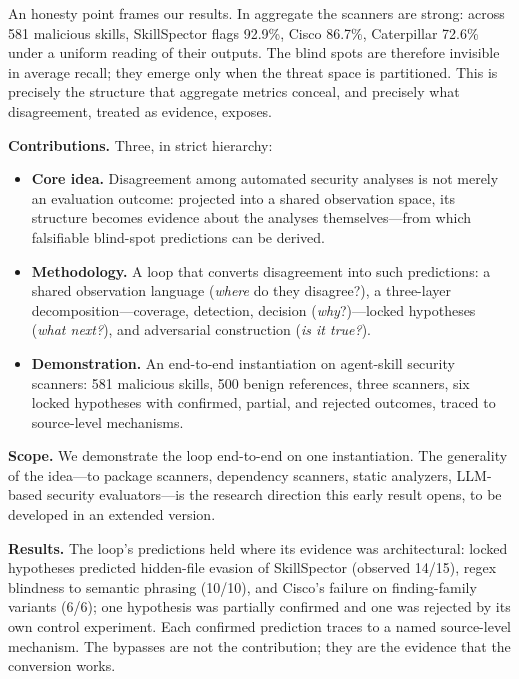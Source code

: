 \documentclass[sigconf,nonacm]{acmart}
\begin{document}
An honesty point frames our results.
In aggregate the scanners are strong: across 581 malicious skills, SkillSpector flags 92.9\%, Cisco 86.7\%, Caterpillar 72.6\% under a uniform reading of their outputs.
The blind spots are therefore invisible in average recall; they emerge only when the threat space is partitioned.
This is precisely the structure that aggregate metrics conceal, and precisely what disagreement, treated as evidence, exposes.

\noindent\textbf{Contributions.} Three, in strict hierarchy:
\begin{itemize}
  \item \textbf{Core idea.} Disagreement among automated security analyses is not merely an evaluation outcome: projected into a shared observation space, its structure becomes evidence about the analyses themselves---from which falsifiable blind-spot predictions can be derived.
  \item \textbf{Methodology.} A loop that converts disagreement into such predictions: a shared observation language (\emph{where} do they disagree?), a three-layer decomposition---coverage, detection, decision (\emph{why}?)---locked hypotheses (\emph{what next?}), and adversarial construction (\emph{is it true?}).
  \item \textbf{Demonstration.} An end-to-end instantiation on agent-skill security scanners: 581 malicious skills, 500 benign references, three scanners, six locked hypotheses with confirmed, partial, and rejected outcomes, traced to source-level mechanisms.
\end{itemize}

\noindent\textbf{Scope.} We demonstrate the loop end-to-end on one instantiation.
The generality of the idea---to package scanners, dependency scanners, static analyzers, LLM-based security evaluators---is the research direction this early result opens, to be developed in an extended version.

\noindent\textbf{Results.} The loop's predictions held where its evidence was architectural: locked hypotheses predicted hidden-file evasion of SkillSpector (observed 14/15), regex blindness to semantic phrasing (10/10), and Cisco's failure on finding-family variants (6/6); one hypothesis was partially confirmed and one was rejected by its own control experiment. Each confirmed prediction traces to a named source-level mechanism. The bypasses are not the contribution; they are the evidence that the conversion works.

\end{document}
